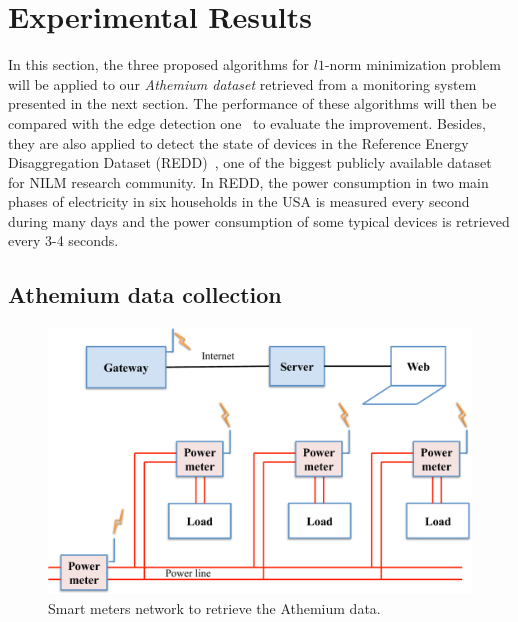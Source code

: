 \section{Experimental Results}
In this section, the three proposed algorithms for $l1$-norm minimization problem will be applied to our \emph{Athemium dataset} retrieved from a monitoring system presented in the next section. The performance of these algorithms will then be compared with the edge detection one~\cite{Hart92} to evaluate the improvement. Besides, they are also applied to detect the state of devices in the Reference Energy Disaggregation Dataset (REDD)~\cite{Kolter11redd}, one of the biggest publicly available dataset for NILM research community. In REDD, the power consumption in two main phases of electricity in six households in the USA is measured every second during many days and the power consumption of some typical devices is retrieved every 3-4 seconds.




\subsection{Athemium data collection}

\begin{figure}[h]
\centering
\includegraphics[width=.8\textwidth]{./chapters/chapter3/images/measurement_system.pdf} 
\caption{Smart meters network to retrieve the Athemium data.} 
\label{fig:L2} 
\end{figure}

